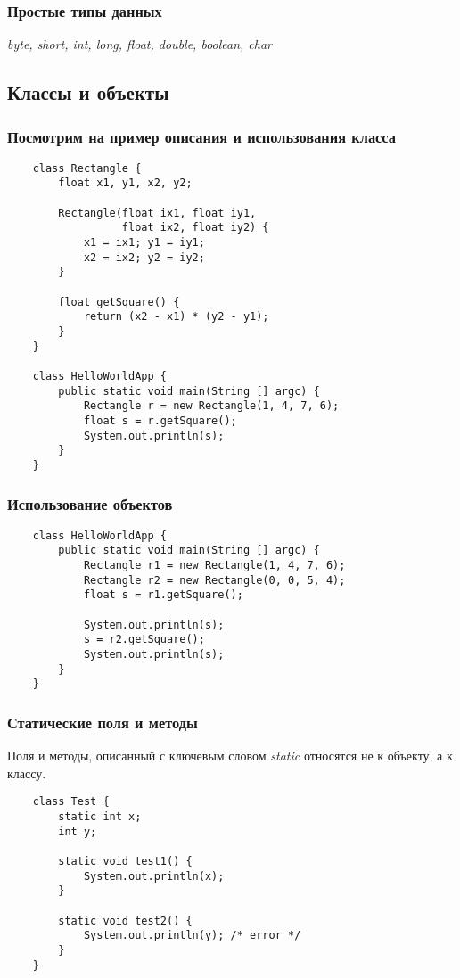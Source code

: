 \begin{frame}
	\frametitle{Простые типы данных}

	\begin{LARGE}
	\emph{byte, short, int, long, float, double, boolean, char}
	\end{LARGE}
\end{frame}

\subsection{Классы и объекты}
\begin{frame}[fragile]
	\frametitle{Посмотрим на пример описания и использования класса}
	\begin{verbatim}
	class Rectangle {
	    float x1, y1, x2, y2; 

	    Rectangle(float ix1, float iy1,
	              float ix2, float iy2) {
	        x1 = ix1; y1 = iy1;
	        x2 = ix2; y2 = iy2;
	    }   

	    float getSquare() {
	        return (x2 - x1) * (y2 - y1);
	    }   
	}

	class HelloWorldApp {
	    public static void main(String [] argc) {
	        Rectangle r = new Rectangle(1, 4, 7, 6);
	        float s = r.getSquare();
	        System.out.println(s);
	    }   
	}
	\end{verbatim}
\end{frame}

\begin{frame}[fragile]
	\frametitle{Использование объектов}

	\begin{verbatim}
	class HelloWorldApp {
	    public static void main(String [] argc) {
	        Rectangle r1 = new Rectangle(1, 4, 7, 6);
	        Rectangle r2 = new Rectangle(0, 0, 5, 4);
	        float s = r1.getSquare();

	        System.out.println(s);
	        s = r2.getSquare();
	        System.out.println(s);
	    }
	}
	\end{verbatim}
\end{frame}


\begin{frame}[fragile]
	\frametitle{Статические поля и методы}

	\begin{large}
	Поля и методы, описанный с ключевым словом \emph{static} относятся не к объекту, а к классу.
	\end{large}

	\medskip
	\begin{verbatim}
	class Test {
	    static int x;
	    int y;

	    static void test1() {
	        System.out.println(x);
	    }

	    static void test2() {
	        System.out.println(y); /* error */
	    }
	}
	\end{verbatim}
\end{frame}

